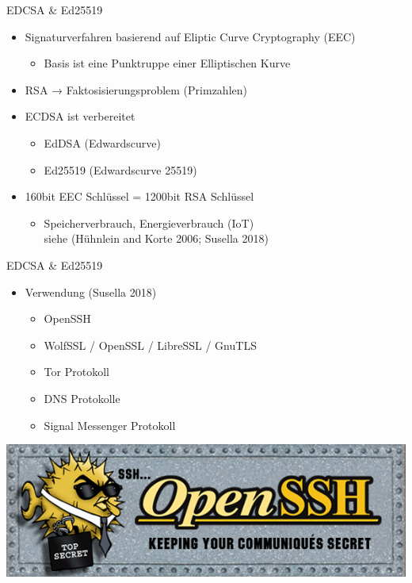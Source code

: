 \documentclass[
  9pt,
  ignorenonframetext,
  aspectratio=169,
]{beamer}
\providecommand{\tightlist}{%
  \setlength{\itemsep}{0pt}\setlength{\parskip}{0pt}}
\begin{document}
\begin{frame}{EDCSA \& Ed25519}
\protect\hypertarget{edcsa-ed25519}{}
\begin{itemize}
\tightlist
\item
  Signaturverfahren basierend auf Eliptic Curve Cryptography (EEC)

  \begin{itemize}
  \tightlist
  \item
    Basis ist eine Punktruppe einer Elliptischen Kurve
  \end{itemize}
\item
  RSA → Faktosisierungsproblem (Primzahlen)
\item
  ECDSA ist verbereitet

  \begin{itemize}
  \tightlist
  \item
    EdDSA (Edwardscurve)
  \item
    Ed25519 (Edwardscurve 25519)
  \end{itemize}
\item
  160bit EEC Schlüssel = 1200bit RSA Schlüssel

  \begin{itemize}
  \tightlist
  \item
    Speicherverbrauch, Energieverbrauch (IoT)\\
    siehe (Hühnlein and Korte 2006; Susella 2018)
  \end{itemize}
\end{itemize}
\end{frame}

\begin{frame}{EDCSA \& Ed25519}
\protect\hypertarget{edcsa-ed25519-1}{}
\begin{itemize}
\tightlist
\item
  Verwendung (Susella 2018)

  \begin{itemize}
  \tightlist
  \item
    OpenSSH
  \item
    WolfSSL / OpenSSL / LibreSSL / GnuTLS
  \item
    Tor Protokoll
  \item
    DNS Protokolle
  \item
    Signal Messenger Protokoll
  \end{itemize}
\end{itemize}

\includegraphics{Abbildungen/openssh.png}
\end{frame}
\end{document}
